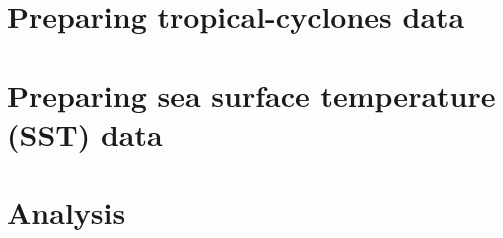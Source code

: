 \section{Preparing tropical-cyclones data}\label{sec:data-prep}

\newpage

\newpage


\section{Preparing sea surface temperature (SST) data}\label{sec:data-prep-2}

\newpage


\section{Analysis}\label{sec:analysis}

\newpage

